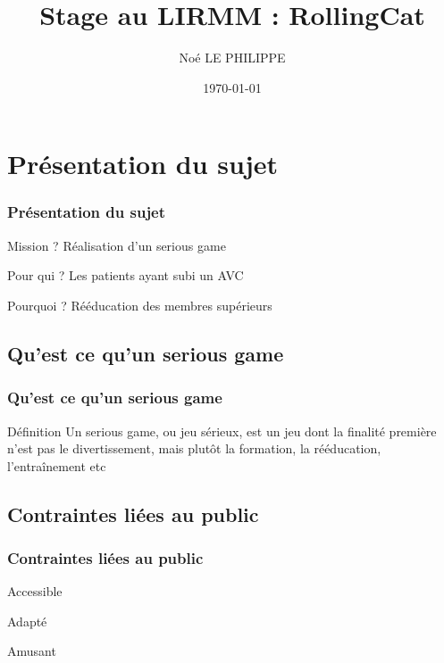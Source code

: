 \documentclass{beamer}
\title{Stage au LIRMM : RollingCat}
\author{Noé LE PHILIPPE}
\institute{}
\date{\today}
\begin{document}
\begin{frame}
\titlepage
\end{frame}
	
\section{Présentation du sujet}
\begin{frame}
\frametitle{Présentation du sujet}

\begin{block}{Mission ?}
Réalisation d'un serious game
\end{block}

\pause

\begin{block}{Pour qui ?}
Les patients ayant subi un AVC
\end{block}

\pause

\begin{block}{Pourquoi ?}
Rééducation des membres supérieurs
\end{block}

\end{frame}

\subsection{Qu'est ce qu'un serious game}
\begin{frame}
\frametitle{Qu'est ce qu'un serious game}

\begin{block}{Définition}
Un serious game, ou jeu sérieux, est un jeu dont la finalité première n'est pas le divertissement, mais plutôt la formation, la rééducation, l'entraînement etc
\end{block}

\end{frame}

\subsection{Contraintes liées au public}
\begin{frame}
\frametitle{Contraintes liées au public}

\begin{block}{}
Accessible
\end{block}
\pause

\begin{block}{}
Adapté
\end{block}
\pause
\begin{block}{}
Amusant
\end{block}

\end{frame}
 
\end{document}
